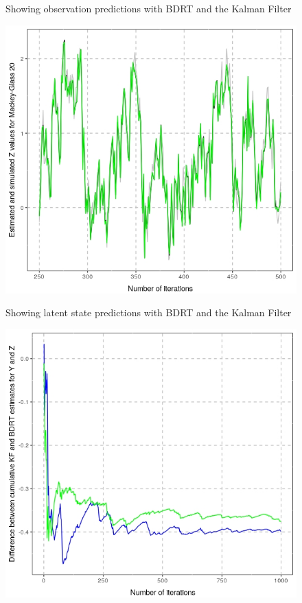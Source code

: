 \documentclass[a1paper,portrait, fontscale=0.45]{baposter}
\begin{document}
\begin{poster}
{\begin{multicols}{3}
\begin{figure}[H]
\begin{minipage}[c]{0.6\linewidth}
\label{fig:ypred}
\vspace{-1.7em}
\caption{Showing observation predictions with BDRT and the Kalman Filter}
\end{minipage}
\end{figure}
\begin{figure}[H]
\hspace{1em}
\begin{minipage}[c]{0.6\linewidth}
\includegraphics[width=\linewidth]{statez.jpeg}
\label{fig:zpred}
\vspace{-1.7em}
\caption{Showing latent state predictions with BDRT and the Kalman Filter}
\end{minipage}
\end{figure}
\begin{figure}[H]
\hspace{1em}
\begin{minipage}[c]{0.6\linewidth}
\includegraphics[width=\linewidth]{kbdiff.jpeg}

\end{minipage}
\end{figure}
\end{multicols}}
\end{poster}
\end{document}
